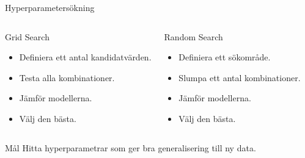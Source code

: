 \documentclass[10pt,english]{beamer}
\begin{document}
\begin{frame}{Hyperparametersökning}

\begin{columns}


\begin{block}{Grid Search}
\begin{itemize}
\item Definiera ett antal kandidatvärden.
\item Testa alla kombinationer.
\item Jämför modellerna.
\item Välj den bästa.
\end{itemize}
\end{block}


\begin{block}{Random Search}
\begin{itemize}
\item Definiera ett sökområde.
\item Slumpa ett antal kombinationer.
\item Jämför modellerna.
\item Välj den bästa.
\end{itemize}
\end{block}

\end{columns}

\vspace{0.5cm}

\begin{alertblock}{Mål}
Hitta hyperparametrar som ger bra generalisering till ny data.
\end{alertblock}


\end{frame}
\end{document}
